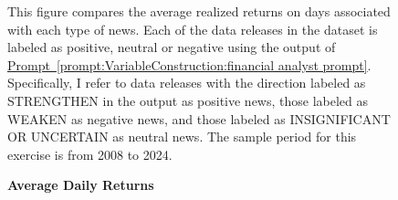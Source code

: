 \documentclass[12pt,oneside,letter]{article}
\newcommand*{\myprp}[1]{\hyperref[{#1}]{Prompt~\ref*{#1}}}
\begin{document}
\begin{landscape}
	
	\begin{figure}

	    \begin{center}
	    	\caption{\bf Average Daily Returns}
		    \medskip
		     \label{fig:DifferentialImpact:pos neg differential impact smaller window}
	    \end{center}
	
	
	    \begin{small}
	    This figure compares the average realized returns on days associated with each type of news. Each of the data releases in the dataset is labeled as positive, neutral or negative using the output of \myprp{prompt:VariableConstruction:financial analyst prompt}. Specifically, I refer to data releases with the direction labeled as STRENGTHEN in the output as positive news, those labeled as WEAKEN as negative news, and those labeled as INSIGNIFICANT OR UNCERTAIN as neutral news. The sample period for this exercise is from 2008 to 2024.
	    \end{small}


	\end{figure}

\end{landscape}
\end{document}

